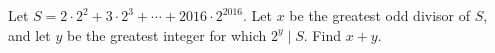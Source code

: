 Let $S=2\cdot2^2+3\cdot2^3+\cdots+2016\cdot2^{2016}$. Let $x$ be the greatest odd divisor of $S$, and let $y$ be the greatest integer for which $2^y\mid S$. Find $x+y$.
